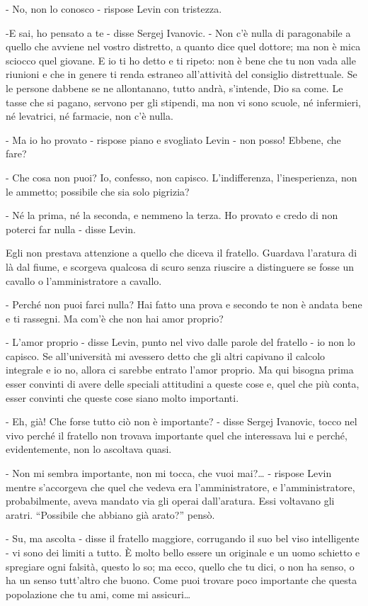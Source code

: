 - No, non lo conosco - rispose Levin con tristezza. 

-E sai, ho pensato a te - disse Sergej Ivanovic. - Non c'è nulla di paragonabile a quello che avviene nel vostro distretto, a quanto dice quel dottore; ma non è mica sciocco quel giovane. E io ti ho detto e ti ripeto: non è bene che tu non vada alle riunioni e che in genere ti renda estraneo all'attività del consiglio distrettuale. Se le persone dabbene se ne allontanano, tutto andrà, s'intende, Dio sa come. Le tasse che si pagano, servono per gli stipendi, ma non vi sono scuole, né infermieri, né levatrici, né farmacie, non c'è nulla. 

- Ma io ho provato - rispose piano e svogliato Levin - non posso! Ebbene, che fare? 

- Che cosa non puoi? Io, confesso, non capisco. L'indifferenza, l'inesperienza, non le ammetto; possibile che sia solo pigrizia? 

- Né la prima, né la seconda, e nemmeno la terza. Ho provato e credo di non poterci far nulla - disse Levin. 

Egli non prestava attenzione a quello che diceva il fratello. Guardava l'aratura di là dal fiume, e scorgeva qualcosa di scuro senza riuscire a distinguere se fosse un cavallo o l'amministratore a cavallo. 

- Perché non puoi farci nulla? Hai fatto una prova e secondo te non è andata bene e ti rassegni. Ma com'è che non hai amor proprio? 

- L'amor proprio - disse Levin, punto nel vivo dalle parole del fratello - io non lo capisco. Se all'università mi avessero detto che gli altri capivano il calcolo integrale e io no, allora ci sarebbe entrato l'amor proprio. Ma qui bisogna prima esser convinti di avere delle speciali attitudini a queste cose e, quel che più conta, esser convinti che queste cose siano molto importanti. 

- Eh, già! Che forse tutto ciò non è importante? - disse Sergej Ivanovic, tocco nel vivo perché il fratello non trovava importante quel che interessava lui e perché, evidentemente, non lo ascoltava quasi. 

- Non mi sembra importante, non mi tocca, che vuoi mai?\ldots{} - rispose Levin mentre s'accorgeva che quel che vedeva era l'amministratore, e l'amministratore, probabilmente, aveva mandato via gli operai dall'aratura. Essi voltavano gli aratri. ``Possibile che abbiano già arato?'' pensò. 

- Su, ma ascolta - disse il fratello maggiore, corrugando il suo bel viso intelligente - vi sono dei limiti a tutto. È molto bello essere un originale e un uomo schietto e spregiare ogni falsità, questo lo so; ma ecco, quello che tu dici, o non ha senso, o ha un senso tutt'altro che buono. Come puoi trovare poco importante che questa popolazione che tu ami, come mi assicuri\ldots{} 

